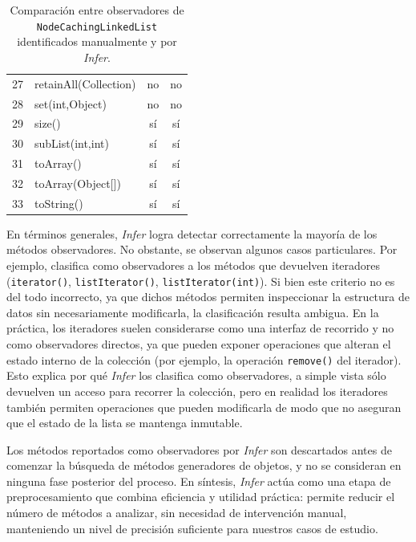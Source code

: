 \begin{table}[H]
\begin{tabular}{clcc}
27 & retainAll(Collection)        & no  & no \\
28 & set(int,Object)              & no  & no \\
29 & size()                       & sí  & sí \\
30 & subList(int,int)             & sí  & sí \\
31 & toArray()                    & sí  & sí \\
32 & toArray(Object[])            & sí  & sí \\
33 & toString()                   & sí  & sí \\
\bottomrule
\end{tabular}
\caption{Comparación entre observadores de \texttt{NodeCachingLinkedList} identificados manualmente y por \emph{Infer}.}
\label{tab:ncl-infer-comparacion}
\end{table}

En términos generales, \emph{Infer} logra detectar correctamente la mayoría de los métodos observadores. 
No obstante, se observan algunos casos particulares. 
Por ejemplo, clasifica como observadores a los métodos que devuelven iteradores 
(\texttt{iterator()}, \texttt{listIterator()}, \texttt{listIterator(int)}). 
Si bien este criterio no es del todo incorrecto, ya que dichos métodos permiten inspeccionar 
la estructura de datos sin necesariamente modificarla, la clasificación resulta ambigua. 
En la práctica, los iteradores suelen considerarse como una interfaz de recorrido y no como observadores directos, 
ya que pueden exponer operaciones que alteran el estado interno de la colección 
(por ejemplo, la operación \texttt{remove()} del iterador). 
Esto explica por qué \emph{Infer} los clasifica como observadores,
a simple vista sólo devuelven un acceso para recorrer la colección, 
pero en realidad los iteradores también permiten operaciones que pueden modificarla 
de modo que no aseguran que el estado de la lista se mantenga inmutable.

Los métodos reportados como observadores por \emph{Infer} son descartados antes de comenzar la búsqueda de métodos generadores de objetos, y no se consideran en ninguna fase posterior del proceso.
En síntesis, \emph{Infer} actúa como una etapa de preprocesamiento que combina eficiencia y utilidad práctica: permite reducir el número de métodos a analizar, sin necesidad de intervención manual, manteniendo un nivel de precisión suficiente para nuestros casos de estudio.


